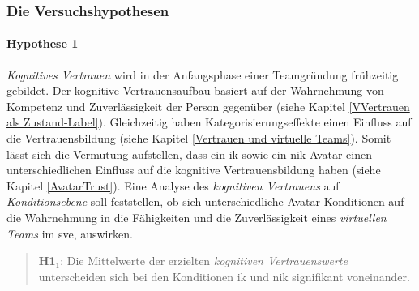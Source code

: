 \documentclass[a4paper,11pt]{article}%
\renewcommand{\\}{\vspace*{0.5\baselineskip} \newline}
\begin{document}
\subsubsection{Die Versuchshypothesen}
\label{VersuchshypothesenAuflistung}

\paragraph{Hypothese 1}
\textit{Kognitives Vertrauen} wird in der Anfangsphase einer Teamgründung frühzeitig gebildet.
Der kognitive Vertrauensaufbau basiert auf der Wahrnehmung von Kompetenz und Zuverlässigkeit der Person gegenüber (siehe Kapitel \ref{VVertrauen als Zustand-Label}). Gleichzeitig haben Kategorisierungseffekte einen Einfluss auf die Vertrauensbildung (siehe Kapitel \ref{Vertrauen und virtuelle Teams}). Somit lässt sich die Vermutung aufstellen, dass ein \ac{ik} sowie ein \ac{nik} Avatar einen unterschiedlichen Einfluss auf die kognitive Vertrauensbildung haben (siehe Kapitel \ref{AvatarTrust}).
Eine Analyse des \textit{kognitiven Vertrauens} auf \textit{Konditionsebene} soll feststellen, ob sich unterschiedliche Avatar-Konditionen auf die Wahrnehmung in die Fähigkeiten und die Zuverlässigkeit eines \textit{virtuellen Teams} im \ac{sve}, auswirken.\newline
\begin{quote}
\textbf{H1$_{1}$}: Die Mittelwerte der erzielten \textit{kognitiven Vertrauenswerte} unterscheiden sich bei den Konditionen \ac{ik} und \ac{nik} signifikant voneinander.
\end{quote}
\end{document}
